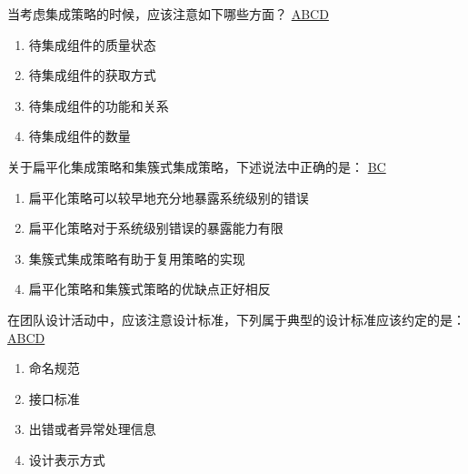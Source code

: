 \begin{problem}
	当考虑集成策略的时候，应该注意如下哪些方面？
	\uline{ABCD}      
    \vspace{-0.8em}
    \begin{multicols}{2}
        \begin{enumerate}[label=\Alph*.]
            \item 待集成组件的质量状态
            \item 待集成组件的获取方式
            \item 待集成组件的功能和关系
            \item 待集成组件的数量
        \end{enumerate}
    \end{multicols}
    \vspace{-1em}
\end{problem}



\begin{problem}
	关于扁平化集成策略和集簇式集成策略，下述说法中正确的是： 
	\uline{BC}      
        \begin{enumerate}[label=\Alph*.]
            \item 扁平化策略可以较早地充分地暴露系统级别的错误
            \item 扁平化策略对于系统级别错误的暴露能力有限
            \item 集簇式集成策略有助于复用策略的实现
            \item 扁平化策略和集簇式策略的优缺点正好相反
        \end{enumerate}
\end{problem}



\begin{problem}
	在团队设计活动中，应该注意设计标准，下列属于典型的设计标准应该约定的是：
	\uline{ABCD}    
    \vspace{-0.8em}
    \begin{multicols}{2}
        \begin{enumerate}[label=\Alph*.]
            \item 命名规范
            \item 接口标准
            \item 出错或者异常处理信息
            \item 设计表示方式
        \end{enumerate}
    \end{multicols}
    \vspace{-1em}
\end{problem}



